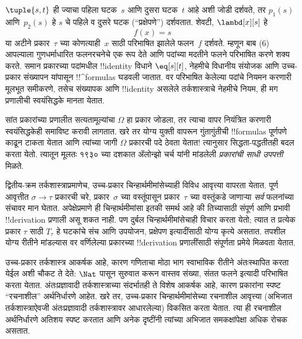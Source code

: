 \documentclass[../../../include/open-logic-section]{subfiles}
\begin{document}
$\tuple{s, t}$ ही ज्याचा पहिला घटक~$s$ आणि दुसरा घटक~$t$ आहे अशी जोडी
दर्शवते, तर $p_1(s)$ आणि~$p_2(s)$ हे $s$ चे पहिले व दुसरे घटक
(“प्रक्षेपणे”) दर्शवतात. शेवटी, $\lambd[x][s]$ हे
\[
f(x) = s
\]
या अटीने प्रकार~$\tau$ च्या कोणत्याही~$x$ साठी परिभाषित झालेले फलन~$f$
दर्शवते.
म्हणून बाब (6) आपल्याला गुणधर्माधारित फलनरचनेचे एक रूप देते आणि
पदांच्या मदतीने फलने परिभाषित करणे शक्य करते. समान प्रकारच्या पदांमधील
!!{identity} विधाने $\eq[s][t]$, नेहमीचे विधानीय संयोजक आणि उच्च-प्रकार
संख्यापन यांपासून !!^{formula}s घडवली जातात. वर परिभाषित केलेल्या पदांचे
नियमन करणारी मूलभूत समीकरणे, तसेच संख्यापक आणि !!{identity} असलेले
तर्कशास्त्राचे नेहमीचे नियम, ही मग प्रणालीची स्वयंसिद्धके मानता येतात.

सांत प्रकारांच्या प्रणालीत सत्यतामूल्यांचा $\Omega$ हा प्रकार जोडला, तर
त्याचा वापर नियंत्रित करणारी स्वयंसिद्धकेही समाविष्ट करावी लागतात. खरे तर
योग्य युक्ती वापरून गुंतागुंतीची !!{formula}s पूर्णपणे काढून टाकता येतात आणि
त्यांच्या जागी $\Omega$ प्रकारची पदे ठेवता येतात!{} त्यानुसार सिद्धता-पद्धतीतही
बदल करता येतो. त्यातून मूलतः १९३० च्या दशकात ॲलोन्झो चर्च यांनी मांडलेली
\emph{प्रकारांची साधी उपपत्ती} मिळते.

द्वितीय-क्रम तर्कशास्त्राप्रमाणेच, उच्च-प्रकार चिन्हार्थमीमांसेच्याही विविध
आवृत्त्या वापरता येतात. पूर्ण आवृत्तीत $\sigma \to \tau$ प्रकारची चरे,
प्रकार~$\sigma$ च्या वस्तूंपासून प्रकार~$\tau$ च्या वस्तूंकडे जाणाऱ्या
\emph{सर्व} फलनांच्या संचावर मान घेतात. अपेक्षेप्रमाणे ही चिन्हार्थमीमांसा
इतकी समर्थ आहे की तिच्यासाठी संपूर्ण आणि प्रभावी !!{derivation} प्रणाली
असू शकत नाही. पण दुर्बल चिन्हार्थमीमांसेचाही विचार करता येतो; त्यात
त प्रत्येक प्रकार $\tau$ साठी $T_\tau$ हे घटकांचे संच
आणि उपयोजन, प्रक्षेपण इत्यादींसाठी योग्य कृत्ये असतात. तपशील योग्य रीतीने
मांडल्यास वर वर्णिलेल्या प्रकारच्या !!{derivation} प्रणालींसाठी संपूर्णता
प्रमेये मिळवता येतात.

उच्च-प्रकार तर्कशास्त्र आकर्षक आहे, कारण गणिताचा मोठा भाग स्वाभाविक रीतीने
अंतःस्थापित करता येईल अशी चौकट ते देते: $\Nat$ पासून सुरुवात करून वास्तव
संख्या, संतत फलने इत्यादी परिभाषित करता येतात. अंतःप्रज्ञावादी तर्कशास्त्राच्या
संदर्भातही ते विशेष आकर्षक आहे, कारण प्रकारांना स्पष्ट “रचनाशील” अर्थनिर्धारणे
आहेत. खरे तर, उच्च-प्रकार चिन्हार्थमीमांसेच्या रचनाशील आवृत्त्या
(अभिजात तर्कशास्त्राऐवजी अंतःप्रज्ञावादी तर्कशास्त्रावर आधारलेल्या) विकसित
करता येतात. त्या ही रचनाशील अर्थनिर्धारणे अतिशय स्पष्ट करतात आणि अनेक
दृष्टींनी त्यांच्या अभिजात समकक्षांपेक्षा अधिक रोचक असतात.
\end{document}
